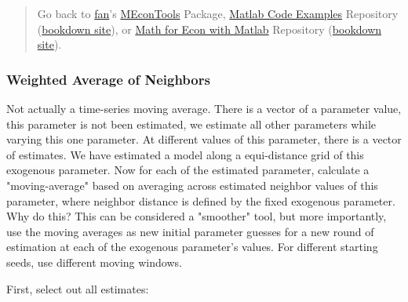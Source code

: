 \documentclass[
]{book}
\begin{document}
\begin{quote}
Go back to \href{http://fanwangecon.github.io/}{fan}'s \href{https://fanwangecon.github.io/MEconTools/}{MEconTools} Package, \href{https://fanwangecon.github.io/M4Econ/}{Matlab Code Examples} Repository (\href{https://fanwangecon.github.io/M4Econ/bookdown}{bookdown site}), or \href{https://fanwangecon.github.io/Math4Econ/}{Math for Econ with Matlab} Repository (\href{https://fanwangecon.github.io/Math4Econ/bookdown}{bookdown site}).
\end{quote}

\hypertarget{weighted-average-of-neighbors}{%
\subsubsection{Weighted Average of Neighbors}\label{weighted-average-of-neighbors}}

Not actually a time-series moving average. There is a vector of a
parameter value, this parameter is not been estimated, we estimate all
other parameters while varying this one parameter. At different values
of this parameter, there is a vector of estimates. We have estimated a
model along a equi-distance grid of this exogenous parameter. Now for
each of the estimated parameter, calculate a "moving-average" based on
averaging across estimated neighbor values of this parameter, where
neighbor distance is defined by the fixed exogenous parameter. Why do
this? This can be considered a "smoother" tool, but more importantly,
use the moving averages as new initial parameter guesses for a new round
of estimation at each of the exogenous parameter's values. For different
starting seeds, use different moving windows.

First, select out all estimates:
\end{document}
